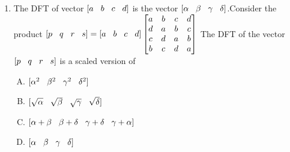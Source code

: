 \documentclass[journal,12pt,twocolumn]{IEEEtran}
\begin{document}
\begin{enumerate}
\item The DFT of vector $[a\hspace{3mm}b\hspace{3mm}c\hspace{3mm}d]$ is the vector $[\alpha \hspace{3mm}\beta \hspace{3mm}\gamma \hspace{3mm} \delta]$.Consider the product \newline $[p\hspace{3mm}q\hspace{3mm}r\hspace{3mm}s]=[a\hspace{3mm}b\hspace{3mm}c\hspace{3mm}d] \begin{bmatrix}
a & b & c & d \\
d & a & b & c \\
c & d & a & b\\
b & c & d & a
\end{bmatrix}$ 
\newline The DFT of the vector $[p\hspace{3mm}q\hspace{3mm}r\hspace{3mm}s] $ is a scaled version of \\
\begin{enumerate}[(A)]

\setlength\itemsep{1em}

\item $[\alpha^{2} \hspace{3mm}\beta^{2} \hspace{3mm}\gamma^{2} \hspace{3mm} \delta^{2}]$
\item $[\sqrt{\alpha} \hspace{3mm}\sqrt{\beta} \hspace{3mm}\sqrt{\gamma} \hspace{3mm}\sqrt{ \delta}]$
\item $[\alpha + \beta \hspace{3mm}\beta + \delta \hspace{3mm}\gamma + \delta \hspace{3mm} \gamma + \alpha]$
\item $[\alpha \hspace{3mm}\beta \hspace{3mm}\gamma \hspace{3mm} \delta]$
\end{enumerate}


\end{enumerate}
\end{document}
